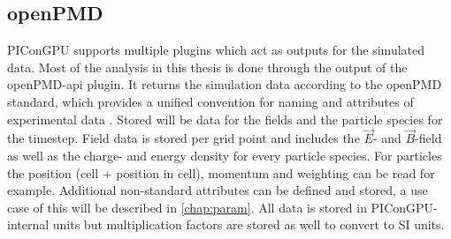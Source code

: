 \documentclass[bachelor_thesis]{subfiles}
\begin{document}
\subsection{openPMD}
PIConGPU supports multiple plugins which act as outputs for the simulated data. Most of the analysis in this thesis is done through the output of the openPMD-api \cite{openPMDAPI} plugin.
It returns the simulation data according to the openPMD standard, which provides a unified convention for naming and attributes of experimental data \cite{openPMDstandard}.
Stored will be data for the fields and the particle species for the timestep. Field data is stored per grid point and includes the $\vec{E}$- and $\vec{B}$-field as well as the charge- and energy density for every particle species.
For particles the position (cell + position in cell), momentum and weighting can be read for example. Additional non-standard attributes can be defined and stored, a use case of this will be described in \autoref{chap:param}.
All data is stored in PIConGPU-internal units but multiplication factors are stored as well to convert to SI units.
\end{document}
